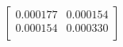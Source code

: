 \begin{equation}
\left[
\begin{array}{cc}
0.000177 & 0.000154 \\
0.000154 & 0.000330 \\
\end{array}
\right]
\end{equation}
